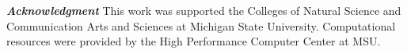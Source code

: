 \documentclass[aps,prl,twocolumn,showpacs,superscriptaddress,groupedaddress]{revtex4-1}  %
\begin{document}
\textit{\textbf{Acknowledgment}}
This work was supported the Colleges of Natural Science and Communication
Arts and Sciences at Michigan State University.
 Computational resources were provided by the High Performance Computer Center at MSU. 
 


%
\end{document}
